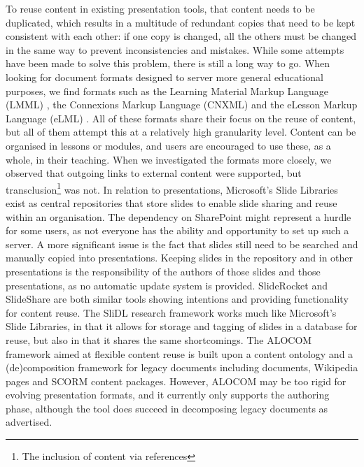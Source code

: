    To reuse content in existing presentation tools, that content needs to be
   duplicated, which results in a multitude of redundant copies that need to be
   kept consistent with each other: if one copy is changed, all the others must
   be changed in the same way to prevent inconsistencies and mistakes. While
   some attempts have been made to solve this problem, there is still a long
   way to go. When looking for document formats designed to server more general
   educational purposes, we find formats such as the Learning Material Markup
   Language (LMML) \citep{suss-1}, the Connexions Markup Language (CNXML) and
   the eLesson Markup Language (eLML) \citep{fisler-1}.  All of these formats
   share their focus on the reuse of content, but all of them attempt this at a
   relatively high granularity level. Content can be organised in lessons or
   modules, and users are encouraged to use these, as a whole, in their
   teaching. When we investigated the formats more closely, we observed that
   outgoing links to external content were supported, but
   transclusion\footnote{The inclusion of content via references} was not.  In
   relation to presentations, Microsoft's Slide Libraries exist as central
   repositories that store slides to enable slide sharing and reuse within an
   organisation. The dependency on SharePoint might represent a hurdle for some
   users, as not everyone has the ability and opportunity to set up such a
   server. A more significant issue is the fact that slides still need to be
   searched and manually copied into presentations. Keeping slides in the
   repository and in other presentations is the responsibility of the authors
   of those slides and those presentations, as no automatic update system is
   provided. SlideRocket and SlideShare are both similar tools showing
   intentions and providing functionality for content reuse. The SliDL
   \citep{canos-1} research framework works much like Microsoft's Slide
   Libraries, in that it allows for storage and tagging of slides in a database
   for reuse, but also in that it shares the same shortcomings. The ALOCOM
   \citep{verbert-1} framework aimed at flexible content reuse is built upon a
   content ontology and a (de)composition framework for legacy documents
   including \ppt documents, Wikipedia pages and SCORM content packages.
   However, ALOCOM may be too rigid for evolving presentation formats, and it
   currently only supports the authoring phase, although the tool does succeed
   in decomposing legacy documents as advertised.

